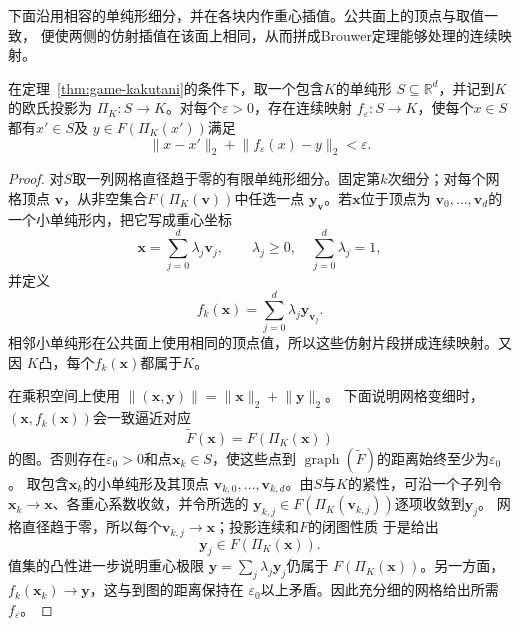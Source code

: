 下面沿用相容的单纯形细分，并在各块内作重心插值。公共面上的顶点与取值一致，
便使两侧的仿射插值在该面上相同，从而拼成Brouwer定理能够处理的连续映射。

\begin{lemma}[单纯形上的连续近似选择]
\label{lem:game-approximate-selection}
在定理~\ref{thm:game-kakutani}的条件下，取一个包含\(K\)的单纯形
\(S\subseteq\mathbb{R}^d\)，并记到\(K\)的欧氏投影为
\(\Pi_K:S\to K\)。对每个\(\varepsilon>0\)，存在连续映射
\(f_\varepsilon:S\to K\)，使每个\(x\in S\)都有\(x'\in S\)及
\(y\in F(\Pi_K(x'))\)满足
\[
  \lVert x-x'\rVert_2
  +
  \lVert f_\varepsilon(x)-y\rVert_2
  <\varepsilon.
\]
\end{lemma}

\begin{proof}
对\(S\)取一列网格直径趋于零的有限单纯形细分。固定第\(k\)次细分；对每个网格顶点
\(\bm{v}\)，从非空集合\(F(\Pi_K(\bm{v}))\)中任选一点
\(\bm{y}_{\bm{v}}\)。若\(\bm{x}\)位于顶点为
\(\bm{v}_0,\ldots,\bm{v}_d\)的一个小单纯形内，把它写成重心坐标
\[
  \bm{x}
  =
  \sum_{j=0}^{d}\lambda_j\bm{v}_j,
  \qquad
  \lambda_j\geq0,\quad
  \sum_{j=0}^{d}\lambda_j=1,
\]
并定义
\[
  f_k(\bm{x})
  =
  \sum_{j=0}^{d}\lambda_j\bm{y}_{\bm{v}_j}.
\]
相邻小单纯形在公共面上使用相同的顶点值，所以这些仿射片段拼成连续映射。又因
\(K\)凸，每个\(f_k(\bm{x})\)都属于\(K\)。

在乘积空间上使用
\(\lVert(\bm{x},\bm{y})\rVert
=\lVert\bm{x}\rVert_2+\lVert\bm{y}\rVert_2\)。
下面说明网格变细时，\((\bm{x},f_k(\bm{x}))\)会一致逼近对应
\[
  \widetilde F(\bm{x})
  =
  F(\Pi_K(\bm{x}))
\]
的图。否则存在\(\varepsilon_0>0\)和点\(\bm{x}_k\in S\)，使这些点到
\(\operatorname{graph}(\widetilde F)\)的距离始终至少为\(\varepsilon_0\)。
取包含\(\bm{x}_k\)的小单纯形及其顶点
\(\bm{v}_{k,0},\ldots,\bm{v}_{k,d}\)。由\(S\)与\(K\)的紧性，可沿一个子列令
\(\bm{x}_k\to\bm{x}\)、各重心系数收敛，并令所选的
\(\bm{y}_{k,j}\in F(\Pi_K(\bm{v}_{k,j}))\)逐项收敛到\(\bm{y}_j\)。
网格直径趋于零，所以每个\(\bm{v}_{k,j}\to\bm{x}\)；投影连续和\(F\)的闭图性质
于是给出
\[
  \bm{y}_j\in F(\Pi_K(\bm{x})).
\]
值集的凸性进一步说明重心极限
\(\bm{y}=\sum_j\lambda_j\bm{y}_j\)仍属于
\(F(\Pi_K(\bm{x}))\)。另一方面，
\(f_k(\bm{x}_k)\to\bm{y}\)，这与到图的距离保持在
\(\varepsilon_0\)以上矛盾。因此充分细的网格给出所需
\(f_\varepsilon\)。
\end{proof}

